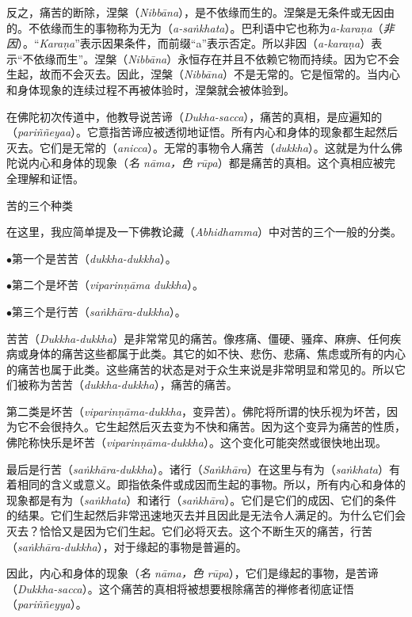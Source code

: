 反之，痛苦的断除，涅槃（{\it Nibb\=ana}），是不依缘而生的。涅槃是无条件或无因由的。不依缘而生的事物称为无为（{\it a-sa\.nkhata}）。巴利语中它也称为{\it a-kara\d na}（{\it 非因}）。“{\it Kara\d na}”表示因果条件，而前缀“a”表示否定。所以非因（{\it a-kara\d na}）表示“不依缘而生”。涅槃（{\it Nibb\=ana}）永恒存在并且不依赖它物而持续。因为它不会生起，故而不会灭去。因此，涅槃（{\it Nibb\=ana}）不是无常的。它是恒常的。当内心和身体现象的连续过程不再被体验时，涅槃就会被体验到。

在佛陀初次传道中，他教导说苦谛（{\it Dukha-sacca}），痛苦的真相，是应遍知的（{\it pari\~n\~neyaa}）。它意指苦谛应被透彻地证悟。所有内心和身体的现象都生起然后灭去。它们是无常的（{\it anicca}）。无常的事物\1令人痛苦（{\it dukkha}）。这就是为什么佛陀说内心和身体的现象（{\it 名 n\=ama，色 r\=upa}）都是痛苦的真相。这个真相应被完全理解和证悟。

\sssubsectnonb 苦的三个种类

在这里，我应简单提及一下佛教论藏（{\it Abhidhamma}）中对苦的三个一般的分类。

{
\leftskip=1.6pc
\item{$\bullet$}第一个是苦苦（{\it dukkha-dukkha}）。
\item{$\bullet$}第二个是坏苦（{\it viparin\d n\=ama dukkha}）。
\item{$\bullet$}第三个是行苦（{\it sa\.nkh\=ara-dukkha}）。

}

苦苦（{\it Dukkha-dukkha}）是非常常见的痛苦。像疼痛、僵硬、骚痒、麻痹、任何疾病或身体的痛苦这些都属于此类。其它的如不快、悲伤、悲痛、焦虑或所有的内心的痛苦也属于此类。这些痛苦的状态是对于众生来说是非常明显和常见的。所以它们被称为苦苦（{\it dukkha-dukkha}），痛苦的痛苦。

第二类是坏苦（{\it viparin\d n\=ama-dukkha}，变异苦）。佛陀将所谓的快乐视为坏苦，因为它不会很持久。它生起然后灭去变为不快和痛苦。因为这个变异为痛苦的性质，佛陀称快乐是坏苦（{\it viparin\d n\=ama-dukkha}）。这个变化可能突然或很快地出现。

最后是行苦（{\it sa\.nkh\=ara-dukkha}）。诸行（{\it Sa\.nkh\=ara}）在这里与有为（{\it sa\.nkhata}）有着相同的含义或意义。即指依条件或成因而生起的事物。所以，所有内心和身体的现象都是有为（{\it sa\.nkhata}）\1和诸行（{\it sa\.nkh\=ara}）。它们是它们的成因、它们的条件的结果。它们生起然后非常迅速地灭去并且因此是无法令人满足的。为什么它们会灭去？恰恰又是因为它们生起。它们必将灭去。这个不断生灭的痛苦，行苦（{\it sa\.nkh\=ara-dukkha}），对于缘起的事物是普遍的。

因此，内心和身体的现象（{\it 名 n\=ama，色 r\=upa}），它们是缘起的事物，是苦谛（{\it Dukkha-sacca}）。这个痛苦的真相将被想要根除痛苦的禅修者彻底证悟（{\it pari\~n\~neyya}）。

